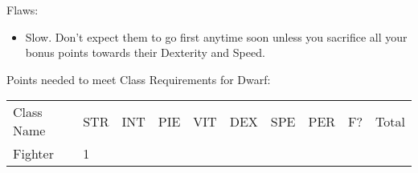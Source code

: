 \documentclass[12pt]{article}
\providecommand{\tightlist}{%
  \setlength{\itemsep}{0pt}\setlength{\parskip}{0pt}}
\begin{document}
Flaws:

\begin{itemize}
\tightlist
\item
  Slow. Don't expect them to go first anytime soon unless you sacrifice
  all your bonus points towards their Dexterity and Speed.
\end{itemize}

Points needed to meet Class Requirements for Dwarf:

\begin{longtable}[]{@{}llllllllll@{}}
\toprule
\begin{minipage}[t]{0.13\columnwidth}\raggedright\strut
Class Name
\strut\end{minipage} &
\begin{minipage}[t]{0.06\columnwidth}\raggedright\strut
STR
\strut\end{minipage} &
\begin{minipage}[t]{0.06\columnwidth}\raggedright\strut
INT
\strut\end{minipage} &
\begin{minipage}[t]{0.06\columnwidth}\raggedright\strut
PIE
\strut\end{minipage} &
\begin{minipage}[t]{0.06\columnwidth}\raggedright\strut
VIT
\strut\end{minipage} &
\begin{minipage}[t]{0.06\columnwidth}\raggedright\strut
DEX
\strut\end{minipage} &
\begin{minipage}[t]{0.06\columnwidth}\raggedright\strut
SPE
\strut\end{minipage} &
\begin{minipage}[t]{0.06\columnwidth}\raggedright\strut
PER
\strut\end{minipage} &
\begin{minipage}[t]{0.07\columnwidth}\raggedright\strut
F?
\strut\end{minipage} &
\begin{minipage}[t]{0.08\columnwidth}\raggedright\strut
Total
\strut\end{minipage}\tabularnewline
\begin{minipage}[t]{0.13\columnwidth}\raggedright\strut
Fighter
\strut\end{minipage} &
\begin{minipage}[t]{0.06\columnwidth}\raggedright\strut
1
\strut\end{minipage} &
\begin{minipage}[t]{0.06\columnwidth}\raggedright\strut

\end{minipage}
\end{longtable}
\end{document}
